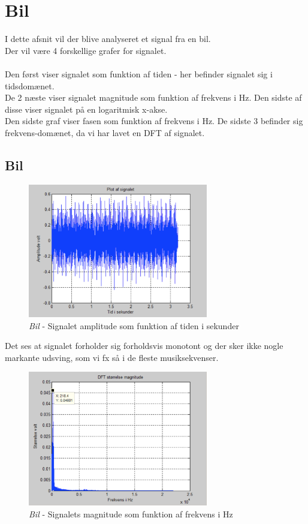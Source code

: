 \chapter{Bil}
I dette afsnit vil der blive analyseret et signal fra en bil. \\
Der vil være 4 forskellige grafer for signalet.\\ \\
Den først viser signalet som funktion af tiden - her befinder signalet sig i tidsdomænet. \\
De 2 næste viser signalet magnitude som funktion af frekvens i Hz. Den sidste af disse viser signalet på en logaritmisk x-akse. \\
Den sidste graf viser fasen som funktion af frekvens i Hz. De sidste 3 befinder sig frekvens-domænet, da vi har lavet en DFT af signalet.


\section{Bil}

\begin{figure}[H]
	\centering
	\includegraphics[width=0.7\textwidth]{Figurer/Bil}
	\caption{\textit{Bil} - Signalet amplitude som funktion af tiden i sekunder}
\end{figure}

Det ses at signalet forholder sig forholdsvis monotont og der sker ikke nogle markante udsving, som vi fx så i de fleste musiksekvenser. 

\begin{figure}[H]
	\centering
	\includegraphics[width=0.7\textwidth]{Figurer/Bil2}
	\caption{\textit{Bil} - Signalets magnitude som funktion af frekvens i Hz}
\end{figure}

